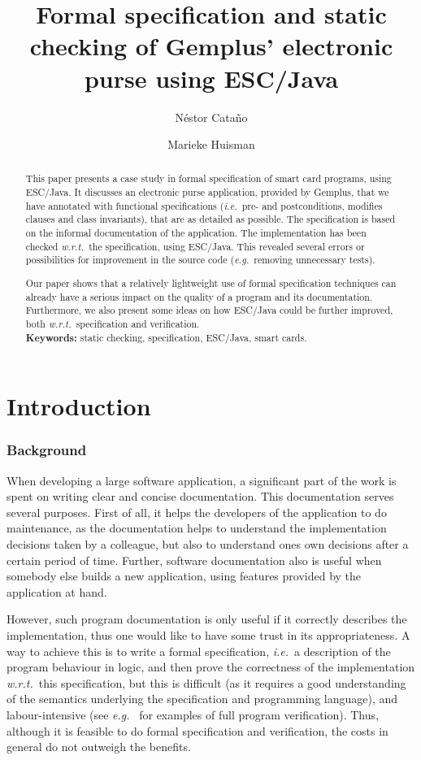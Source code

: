 \documentclass[a4paper]{llncs}
\title{Formal specification and static checking of Gemplus' electronic
purse using ESC/Java}
\author{
  N\'estor Cata\~no
\and
  Marieke Huisman
}
\institute{
  INRIA Sophia-Antipolis, France \\ 
  \email{\{Nestor.Catano, Marieke.Huisman\}@sophia.inria.fr}
}
\begin{document}
%

\maketitle


\begin{abstract}
This paper presents a case study in formal specification of smart card
programs, using ESC/Java. It discusses an electronic purse
application, provided by Gemplus, that we have annotated with
functional specifications (\emph{i.e.}~pre- and
postconditions, modifies
clauses and class invariants), that are as detailed as possible. The
specification is based on the informal documentation of the
application. The implementation has been checked \emph{w.r.t.}~the
specification, using ESC/Java.  This revealed several errors or
possibilities for improvement in the source code (\emph{e.g.}~removing
unnecessary tests).

Our paper shows that a relatively
lightweight use of formal specification techniques can already have
a serious impact on the quality of a program and its
documentation. Furthermore, we also present some ideas on how ESC/Java
could be further improved, both
\emph{w.r.t.}~specification and verification.
\\
\textbf{Keywords:} static checking, specification, ESC/Java, smart cards.
\end{abstract}

\section{Introduction}
\label{SectIntro}

\subsubsection{Background}
When developing a large software application, a significant part of
the work is spent on writing clear and concise documentation. This
documentation serves several purposes. First of all, it helps the
developers of the application to do maintenance, as the documentation
helps to understand the implementation decisions taken by a colleague,
but also to understand ones own decisions after a certain period of
time. Further, software documentation also is useful when somebody
else builds a new application, using features provided by the
application at hand.

However, such program documentation is only useful if it correctly
describes the implementation, thus one would like to have some trust
in its appropriateness. A way to achieve this is to write a formal
specification, \emph{i.e.}~a description of the program behaviour in
logic, and then prove the correctness of the implementation
\emph{w.r.t.}~this specification, but this is difficult (as it
requires a good understanding of the semantics underlying the
specification and programming language), and labour-intensive (see
\emph{e.g.}~\cite{HuismanJB01,BreunesseJB02} for examples of full program
verification). Thus, although it is feasible to do formal
specification and verification, the costs in general do not outweigh
the benefits.
\end{document}
